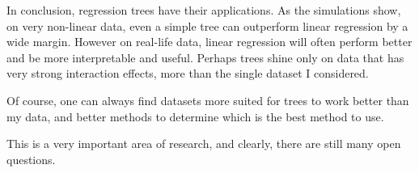 \documentclass[12pt]{article}
\begin{document}
In conclusion, regression trees have their applications. As the simulations show, on very non-linear data, even a simple tree can outperform linear regression by a wide margin. However on real-life data, linear regression will often perform better and be more interpretable and useful. Perhaps trees shine only on data that has very strong interaction effects, more than the single dataset I considered.

Of course, one can always find datasets more suited for trees to work better than my data, and better methods to determine which is the best method to use.

This is a very important area of research, and clearly, there are still many open questions.



\end{document}
